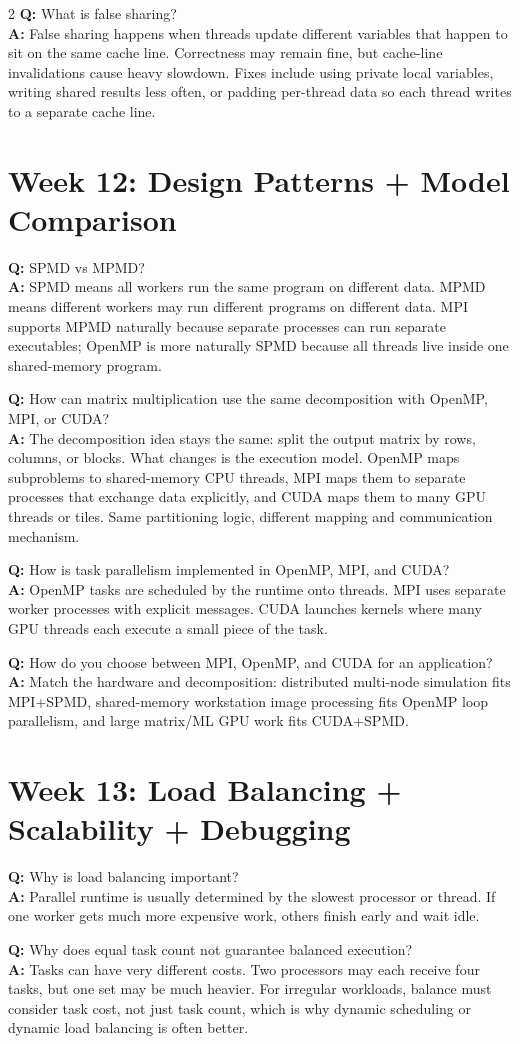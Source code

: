 \documentclass[9pt]{extarticle}
\newcommand{\qa}[2]{\textbf{Q:} #1\\\textbf{A:} #2\par\vspace{1pt}}
\begin{document}
\begin{multicols}{2}
\qa{What is false sharing?}{False sharing happens when threads update different variables that happen to sit on the same cache line. Correctness may remain fine, but cache-line invalidations cause heavy slowdown. Fixes include using private local variables, writing shared results less often, or padding per-thread data so each thread writes to a separate cache line.}

\section{Week 12: Design Patterns + Model Comparison}
\qa{SPMD vs MPMD?}{SPMD means all workers run the same program on different data. MPMD means different workers may run different programs on different data. MPI supports MPMD naturally because separate processes can run separate executables; OpenMP is more naturally SPMD because all threads live inside one shared-memory program.}

\qa{How can matrix multiplication use the same decomposition with OpenMP, MPI, or CUDA?}{The decomposition idea stays the same: split the output matrix by rows, columns, or blocks. What changes is the execution model. OpenMP maps subproblems to shared-memory CPU threads, MPI maps them to separate processes that exchange data explicitly, and CUDA maps them to many GPU threads or tiles. Same partitioning logic, different mapping and communication mechanism.}

\qa{How is task parallelism implemented in OpenMP, MPI, and CUDA?}{OpenMP tasks are scheduled by the runtime onto threads. MPI uses separate worker processes with explicit messages. CUDA launches kernels where many GPU threads each execute a small piece of the task.}

\qa{How do you choose between MPI, OpenMP, and CUDA for an application?}{Match the hardware and decomposition: distributed multi-node simulation fits MPI+SPMD, shared-memory workstation image processing fits OpenMP loop parallelism, and large matrix/ML GPU work fits CUDA+SPMD.}

\section{Week 13: Load Balancing + Scalability + Debugging}
\qa{Why is load balancing important?}{Parallel runtime is usually determined by the slowest processor or thread. If one worker gets much more expensive work, others finish early and wait idle.}

\qa{Why does equal task count not guarantee balanced execution?}{Tasks can have very different costs. Two processors may each receive four tasks, but one set may be much heavier. For irregular workloads, balance must consider task cost, not just task count, which is why dynamic scheduling or dynamic load balancing is often better.}


\end{multicols}
\end{document}
